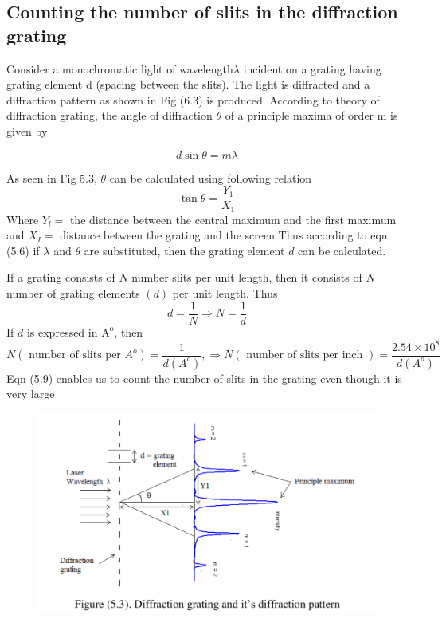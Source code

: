 \documentclass[11pt]{article}
\begin{document}
\subsection{Counting the number of slits in the diffraction grating}


Consider a monochromatic light of wavelength$\lambda$ incident on a grating having
grating element d (spacing between the slits). The light is diffracted and a diffraction pattern as
shown in Fig (6.3) is produced. According to theory of diffraction grating, the angle of
diffraction $\theta$ of a principle maxima of order m is given by

\begin{equation}
	d\sin\theta = m\lambda
\end{equation}

As seen in Fig 5.3, $\theta$ can be calculated using following relation
$$
\tan \theta=\frac{Y_{1}}{X_{1}}
$$
Where $Y_{l}=$ the distance between the central maximum and the first maximum and $X_{I}=$ distance between the grating and the screen
Thus according to eqn (5.6) if $\lambda$ and $\theta$ are substituted, then the grating element $d$ can be calculated.

If a grating consists of $N$ number slits per unit length, then it consists of $N$ number of grating elements $(d)$ per unit length. Thus
$$
d=\frac{1}{N} \Rightarrow N=\frac{1}{d}
$$
If $d$ is expressed in $\mathrm{A}^{\mathrm{o}}$, then
$$
N\left(\text { number of slits per } A^{o}\right)=\frac{1}{d\left(A^{o}\right)}, \Rightarrow N(\text { number of slits per inch })=\frac{2.54 \times 10^{8}}{d\left(A^{o}\right)}
$$
Eqn (5.9) enables us to count the number of slits in the grating even though it is very large
\begin{figure}[H]
	\centering
	\includegraphics[scale=0.4]{4.png}
	\label{it}
\end{figure}
\end{document}
